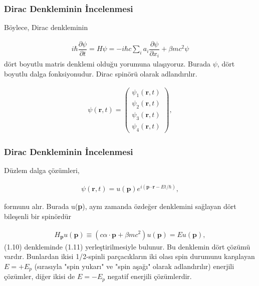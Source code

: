 \documentclass[aspectratio=169,10pt]{beamer}
\begin{document}
	\begin{frame}[allowframebreaks]
	\frametitle{Dirac Denkleminin İncelenmesi}
	Böylece, Dirac denkleminin
	
\begin{align}
	i \hbar \dfrac{\partial \psi }{ \partial t} = H \psi = -i \hbar c \sum_{i}^{} a_{i} \dfrac{\partial \psi}{\partial x_{i}} + \beta m c^{2} \psi
\end{align}
dört boyutlu matris denklemi olduğu yorumuna ulaşıyoruz. Burada $ \psi $, dört boyutlu dalga fonksiyonudur. Dirac spinörü olarak adlandırılır.

\begin{align}
\psi (\textbf{r} , t) = 
	\begin{pmatrix}
	\psi_{1} (\textbf{r} , t) \\  \psi_{2} (\textbf{r} , t)  \\  \psi_{3} (\textbf{r} , t)  \\  \psi_{4} (\textbf{r} , t) 
\end{pmatrix},
\end{align}

\end{frame}

	\begin{frame}[allowframebreaks]
	\frametitle{Dirac Denkleminin İncelenmesi}
	Düzlem dalga çözümleri,

\begin{align}
	\psi (\textbf{r} , t) = u (\textbf{p}) e^{i (\textbf{p} \cdot 	\textbf{r} - Et / \hbar ) },
\end{align}

formunu alır. Burada u(\textbf{p}), aynı zamanda özdeğer denklemini sağlayan dört bileşenli bir spinördür

\begin{align}
	H_{ \textbf{p}} u (\textbf{p}) \equiv (c \alpha \cdot \textbf{p} + \beta mc^{2})u (\textbf{p}) = Eu (\textbf{p}),
\end{align}
(1.10) denkleminde (1.11) yerleştirilmesiyle bulunur. Bu denklemin dört çözümü vardır. Bunlardan ikisi 1/2-spinli parçacıkların iki olası spin durumunu karşılayan $ E = +E_{p} $ (sırasıyla "spin yukarı" ve "spin aşağı" olarak adlandırılır) enerjili çözümler, diğer ikisi de $ E = -E_{p} $ negatif enerjili çözümlerdir.
\end{frame}
	
	
\end{document}
